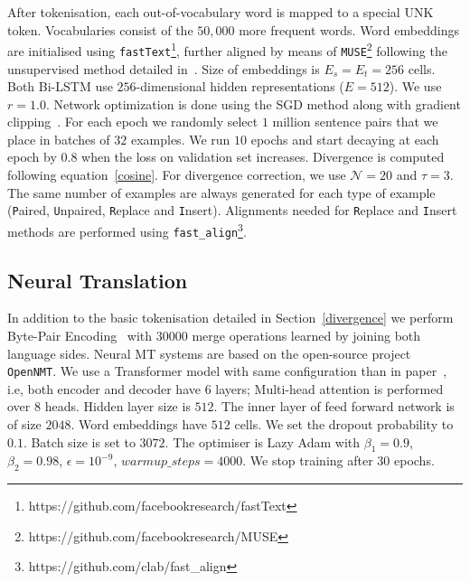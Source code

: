 \documentclass[11pt,a4paper]{article}
\begin{document}
After tokenisation, each out-of-vocabulary word is mapped to a special UNK token.
Vocabularies consist of the $50,000$ more frequent words.
Word embeddings are initialised using \texttt{fastText}\footnote{https://github.com/facebookresearch/fastText}, further aligned by means of \texttt{MUSE}\footnote{https://github.com/facebookresearch/MUSE} following the unsupervised method detailed in~\cite{lample2018word}. 
Size of embeddings is $E_s=E_t=256$ cells. 
Both Bi-LSTM use $256$-dimensional hidden representations ($E=512$).
We use $r=1.0$. 
Network optimization is done using the SGD method along with gradient clipping~\cite{Pascanu:2013:DTR:3042817.3043083}. 
For each epoch we randomly select $1$ million sentence pairs that we place in batches of $32$ examples.  
We run $10$ epochs and start decaying at each epoch by $0.8$ when the loss on validation set increases. 
Divergence is computed following equation~\ref{cosine}. 
For divergence correction, we use $\mathcal{N}=20$ and $\tau=3$.
The same number of examples are always generated for each type of example ({\texttt P}aired, {\texttt U}npaired, {\texttt R}eplace and {\texttt I}nsert). 
Alignments needed for {\texttt R}eplace and {\texttt I}nsert methods are performed using \texttt{fast\_align}\footnote{https://github.com/clab/fast\_align}.

\subsection{Neural Translation}
\label{translation}

In addition to the basic tokenisation detailed in Section~\ref{divergence} we perform Byte-Pair Encoding~\cite{Sennrich2016} with $30000$ merge operations learned by joining both language sides.
Neural MT systems are based on the open-source project  \texttt{OpenNMT}. 
We use a Transformer model with same configuration than in paper~\cite{vaswani2017attention}, i.e, both encoder and decoder have $6$ layers; Multi-head attention is performed over $8$ heads. 
Hidden layer size is $512$. 
The inner layer of feed forward network is of size $2048$. 
Word embeddings have $512$ cells. We set the dropout probability to $0.1$. 
Batch size is set to $3072$.
The optimiser is Lazy Adam with $\beta_1 = 0.9$, $\beta_2 = 0.98$, $\epsilon = 10^{-9}$, $warmup\_steps = 4000$. We stop training after $30$ epochs.
\end{document}
